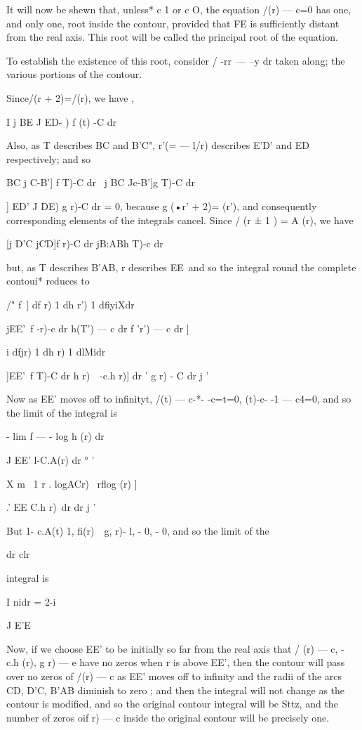It will now be shewn that, unless* c 1 or c O, the equation /(r) — c=0
has one, and only one, root inside the contour, provided that FE is
sufficiently distant from the real axis. This root will be called the
principal root of the equation.

To establish the existence of this root, consider / -rr\ — --y dr
taken along; the various portions of the contour.

Since/(r + 2)=/(r), we have ,

I j BE J ED- ) f (t) -C dr

Also, as T describes BC and B'C", r'(= — l/r) describes E'D' and ED
respectively; and so

   BC j C-B'] f T)-C dr \ j BC Jc-B']g T)-C dr

 ] ED' J DE) g r)-C dr = 0, because g (•r' + 2)= (r'), and
consequently corresponding elements of the integrals cancel. Since /
(r ± 1 ) = A (r), we have

[j D'C jCD]f r)-C dr jB:ABh T)-c dr

but, as T describes B'AB, r describes EE\ and so the integral round
the complete contoui* reduces to

/" f\ ] df r) 1 dh r') 1 dfiyiXdr

jEE'\ f -r)-c dr h(T') — c dr f 'r') — c dr ]

 i dfjr) 1 dh r) 1 dlMidr

]EE'\ f T)-C dr h r)\ \ -c.h r)] dr ' g r) - C dr j '

Now as EE' moves off to infinityt, /(t) — c-*- -c=t=0, (t)-c- -1 —
c4=0, and so the limit of the integral is

- lim f — - log h (r) dr

J EE' l-C.A(r) dr ° '

 X m \ 1 r . logACr) \ rflog (r) ]

.' EE C.h r)\ dr dr j '

But 1- c.A(t) 1, fi(r)~ \,g, r)- l, - 0, - 0, and so the limit of the

dr clr

integral is



I nidr = 2-i

J E'E



Now, if we choose EE' to be initially so far from the real axis that /
(r) — c, - c.h (r), g r) — e have no zeros when r is above EE', then
the contour will pass over no zeros of /(r) — c as EE' moves off to
infinity and the radii of the arcs CD, D'C, B'AB diminish to zero ;
and then the integral will not change as the contour is modified, and
so the original contour integral will be Sttz, and the number of zeros
oif r) — c inside the original contour will be precisely one.


